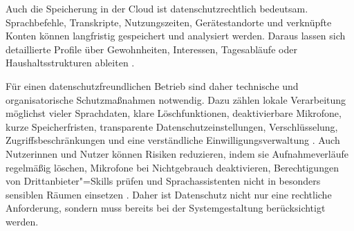 Auch die Speicherung in der Cloud ist datenschutzrechtlich bedeutsam. Sprachbefehle, Transkripte, Nutzungszeiten, Gerätestandorte und verknüpfte Konten können langfristig gespeichert und analysiert werden. Daraus lassen sich detaillierte Profile über Gewohnheiten, Interessen, Tagesabläufe oder Haushaltsstrukturen ableiten \autocite{EDPBLeitlinienSprachassistenzsysteme}.

Für einen datenschutzfreundlichen Betrieb sind daher technische und organisatorische Schutzmaßnahmen notwendig. Dazu zählen lokale Verarbeitung möglichst vieler Sprachdaten, klare Löschfunktionen, deaktivierbare Mikrofone, kurze Speicherfristen, transparente Datenschutzeinstellungen, Verschlüsselung, Zugriffsbeschränkungen und eine verständliche Einwilligungsverwaltung \autocite{EDPBLeitlinienSprachassistenzsysteme}. Auch Nutzerinnen und Nutzer können Risiken reduzieren, indem sie Aufnahmeverläufe regelmäßig löschen, Mikrofone bei Nichtgebrauch deaktivieren, Berechtigungen von Drittanbieter"=Skills prüfen und Sprachassistenten nicht in besonders sensiblen Räumen einsetzen \autocite{EDPBLeitlinienSprachassistenzsysteme}. Daher ist Datenschutz nicht nur eine rechtliche Anforderung, sondern muss bereits bei der Systemgestaltung berücksichtigt werden.